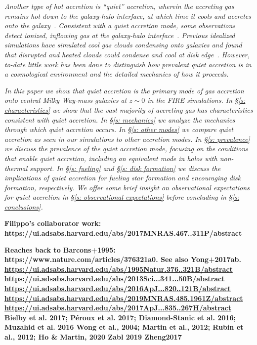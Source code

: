 \documentclass[fleqn,usenatbib]{mnras}
\begin{document}
\textit{
Another type of hot accretion is ``quiet'' accretion, wherein the accreting gas remains hot down to the galaxy-halo interface, at which time it cools and accretes onto the galaxy~\citep{Putman2012}.
Consistent with a quiet accretion mode, some observations detect ionized, inflowing gas at the galaxy-halo interface~\citep{Zheng2017}.
Previous idealized simulations have simulated cool gas clouds condensing onto galaxies and found that disrupted and heated clouds could condense and cool at disk edge~\citep{Heitsch2009}.
However, to-date little work has been done to distinguish how prevalent quiet accretion is in a cosmological environment and the detailed mechanics of how it proceeds.
}

\textit{
In this paper we show that quiet accretion is the primary mode of gas accretion onto central Milky Way-mass galaxies at $z \sim 0$ in the FIRE simulations.
In \S\ref{s: characteristics} we show that the vast majority of accreting gas has characteristics consistent with quiet accretion.
In \S\ref{s: mechanics} we analyze the mechanics through which quiet accretion occurs.
In \S\ref{s: other modes} we compare quiet accretion as seen in our simulations to other accretion modes.
In \S\ref{s: prevalence} we discuss the prevalence of the quiet accretion mode, focusing on the conditions that enable quiet accretion, including an equivalent mode in halos with non-thermal support.
In \S\ref{s: fueling} and \S\ref{s: disk formation} we discuss the implications of quiet accretion for fueling star formation and encouraging disk formation, respectively.
We offer some brief insight on observational expectations for quiet accretion in \S\ref{s: observational expectations} before concluding in \S\ref{s: conclusions}.
}


\textbf{
Filippo's collaborator work: https://ui.adsabs.harvard.edu/abs/2017MNRAS.467..311P/abstract
}

\textbf{
Reaches back to Barcons+1995: https://www.nature.com/articles/376321a0.
See also Yong+2017ab.
\url{https://ui.adsabs.harvard.edu/abs/1995Natur.376..321B/abstract}
\url{https://ui.adsabs.harvard.edu/abs/2013Sci...341...50B/abstract}
\url{https://ui.adsabs.harvard.edu/abs/2016ApJ...820..121B/abstract}
\url{https://ui.adsabs.harvard.edu/abs/2019MNRAS.485.1961Z/abstract}
\url{https://ui.adsabs.harvard.edu/abs/2017ApJ...835..267H/abstract}
Bielby et al. 2017; Péroux et al. 2017; Diamond-Stanic et al. 2016; Muzahid et al. 2016
Wong et al., 2004; Martin et al., 2012; Rubin et al., 2012; Ho \& Martin, 2020
Zabl 2019
Zheng2017
}
\end{document}
